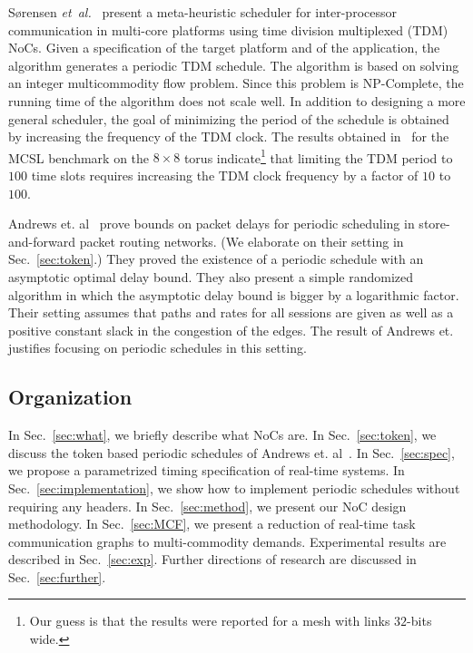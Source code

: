 \documentclass[a4paper,12pt]{article}
\newenvironment{proof sketch}[1]{\noindent {\emph{Proof sketch of #1:}}}{\hfill \qed}
\newcommand{\etal}{{\it et~al.}}
\begin{document}
S{\o}rensen \etal\ \cite{sorensen2014metaheuristic} present a meta-heuristic scheduler for
inter-processor communication in multi-core platforms using time division multiplexed
(TDM) NoCs. Given a specification of the target platform and of the application, the
algorithm generates a periodic TDM schedule. The algorithm is based on solving an
integer multicommodity flow problem. Since this problem is NP-Complete, the running
time of the algorithm does not scale well. In addition to designing a more general
scheduler, the goal of minimizing the period of the schedule is obtained by
increasing the frequency of the TDM clock. The results obtained
in~\cite{sorensen2014metaheuristic} for the MCSL benchmark on the $8\times 8$ torus
indicate\footnote{Our guess is that the results were reported for a mesh with links
  $32$-bits wide.}  that limiting the TDM period to $100$ time slots requires
increasing the TDM clock frequency by a factor of $10$ to $100$.

Andrews et. al~\cite{andrews2000general} prove bounds on packet delays for
periodic scheduling in store-and-forward packet routing networks. (We elaborate on
their setting in Sec.~\ref{sec:token}.) They proved the existence of a periodic
schedule with an asymptotic optimal delay bound. They also present a simple
randomized algorithm in which the asymptotic delay bound is bigger by a logarithmic
factor.  Their setting assumes that paths and rates for all sessions are given as well as
a positive constant slack in the congestion of the edges.  The result of Andrews
et.~\cite{andrews2000general} justifies focusing on periodic schedules in this
setting.

\begin{comment}
  Demiriz and Bagherzadeh \cite{Demiriz:2013:HND:2536522.2536528} employ constraint
  programming to compute a core mapping, namely, a permutation of the PEs on a mesh
  that minimizes the sum of weighted virtual links. In addition, a schedule of the
  tasks on each PE is computed (for homogeneous and heterogeneous cores).  Routing,
  buffering, and scheduling on the NoC is ignored as the network is modeled as a fix
  delay network.  The algorithm does not scale because the running time of constraint
  programming is too high to solve the scheduling problem for large applications in
  the MCSL benchmark.
\end{comment}

\subsection{Organization}
In Sec.~\ref{sec:what}, we briefly describe what NoCs are.
In Sec.~\ref{sec:token}, we discuss the token based periodic schedules of Andrews
et. al~\cite{andrews2000general}.
In Sec.~\ref{sec:spec}, we propose a parametrized timing specification of real-time
systems.
In Sec.~\ref{sec:implementation}, we show how to implement periodic schedules without
requiring any headers.
In Sec.~\ref{sec:method}, we present our NoC design methodology.
In Sec.~\ref{sec:MCF}, we present a reduction of real-time task communication
graphs to multi-commodity demands.
Experimental results are described in Sec.~\ref{sec:exp}. Further directions of
research are discussed in Sec.~\ref{sec:further}.
\end{document}
